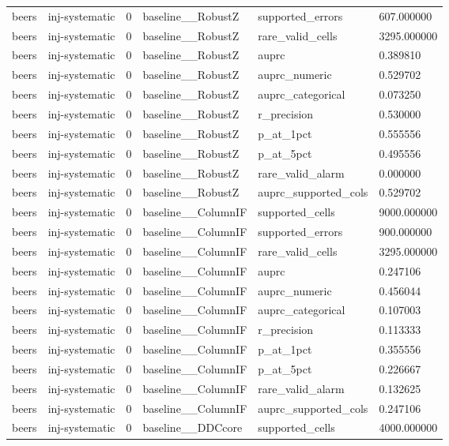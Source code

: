 \begin{tabular}{llllll}
beers & inj-systematic & 0 & baseline\_\_RobustZ & supported\_errors & 607.000000 \\
beers & inj-systematic & 0 & baseline\_\_RobustZ & rare\_valid\_cells & 3295.000000 \\
beers & inj-systematic & 0 & baseline\_\_RobustZ & auprc & 0.389810 \\
beers & inj-systematic & 0 & baseline\_\_RobustZ & auprc\_numeric & 0.529702 \\
beers & inj-systematic & 0 & baseline\_\_RobustZ & auprc\_categorical & 0.073250 \\
beers & inj-systematic & 0 & baseline\_\_RobustZ & r\_precision & 0.530000 \\
beers & inj-systematic & 0 & baseline\_\_RobustZ & p\_at\_1pct & 0.555556 \\
beers & inj-systematic & 0 & baseline\_\_RobustZ & p\_at\_5pct & 0.495556 \\
beers & inj-systematic & 0 & baseline\_\_RobustZ & rare\_valid\_alarm & 0.000000 \\
beers & inj-systematic & 0 & baseline\_\_RobustZ & auprc\_supported\_cols & 0.529702 \\
beers & inj-systematic & 0 & baseline\_\_ColumnIF & supported\_cells & 9000.000000 \\
beers & inj-systematic & 0 & baseline\_\_ColumnIF & supported\_errors & 900.000000 \\
beers & inj-systematic & 0 & baseline\_\_ColumnIF & rare\_valid\_cells & 3295.000000 \\
beers & inj-systematic & 0 & baseline\_\_ColumnIF & auprc & 0.247106 \\
beers & inj-systematic & 0 & baseline\_\_ColumnIF & auprc\_numeric & 0.456044 \\
beers & inj-systematic & 0 & baseline\_\_ColumnIF & auprc\_categorical & 0.107003 \\
beers & inj-systematic & 0 & baseline\_\_ColumnIF & r\_precision & 0.113333 \\
beers & inj-systematic & 0 & baseline\_\_ColumnIF & p\_at\_1pct & 0.355556 \\
beers & inj-systematic & 0 & baseline\_\_ColumnIF & p\_at\_5pct & 0.226667 \\
beers & inj-systematic & 0 & baseline\_\_ColumnIF & rare\_valid\_alarm & 0.132625 \\
beers & inj-systematic & 0 & baseline\_\_ColumnIF & auprc\_supported\_cols & 0.247106 \\
beers & inj-systematic & 0 & baseline\_\_DDCcore & supported\_cells & 4000.000000 \\

\end{tabular}
